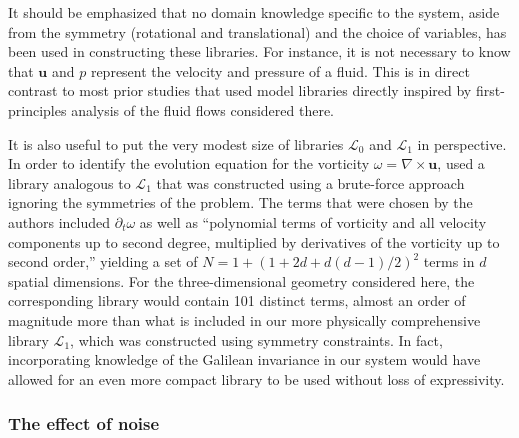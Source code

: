 \documentclass[preprint]{article}
\def\bi#1{\textbf{#1}}
\begin{document}
It should be emphasized that no domain knowledge specific to the system, aside from the symmetry (rotational and translational) and the choice of variables, has been used in constructing these libraries. For instance, it is not necessary to know that ${\bi u}$ and $p$ represent the velocity and pressure of a fluid. This is in direct contrast to most prior studies \citep{raissi2018,reinbold2020,reinbold2021,messenger2021,ma2022} that used model libraries directly inspired by first-principles analysis of the fluid flows considered there.

It is also useful to put the very modest size of libraries $\mathcal{L}_0$ and $\mathcal{L}_1$ in perspective. In order to identify the evolution equation for the vorticity $\omega=\nabla\times{\bi u}$, \citet{rudy2017} used a library analogous to $\mathcal{L}_1$ that was constructed using a brute-force approach ignoring the symmetries of the problem. The terms that were chosen by the authors 
included $\partial_t\omega$ as well as ``polynomial terms of vorticity and all velocity components up to second degree, multiplied by derivatives of the vorticity up to second order,'' yielding a set of $N=1+(1+2d+d(d-1)/2)^2$ terms in $d$ spatial dimensions. For the three-dimensional geometry considered here, the corresponding library would contain 101 distinct terms, almost an order of magnitude more than what is included in our more physically comprehensive library $\mathcal{L}_1$, which was constructed using symmetry constraints. In fact, incorporating knowledge of the Galilean invariance in our system would have allowed for an even more compact library to be used without loss of expressivity.

\subsubsection{The effect of noise}
\end{document}
